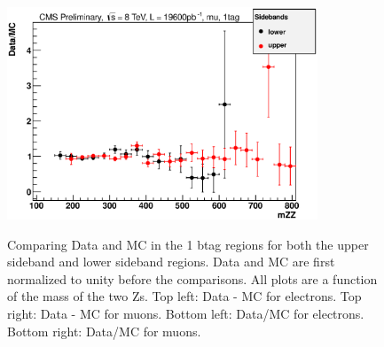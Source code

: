 \begin{figure}[htb!]
{\includegraphics[height=2.5in]{Systematics/plots/divide_mu_2_1}
\\
}
\caption{Comparing Data and MC in the 1 btag regions for both the upper sideband and lower sideband regions. Data and MC are first normalized to unity before the comparisons. All plots are a function of the mass of the two Zs. Top left: Data - MC for electrons.  Top right: Data - MC for muons.  Bottom left: Data/MC for electrons.  Bottom right: Data/MC for muons.
\label{fig:1tag_sideband_up_down}}  
\end{figure}

